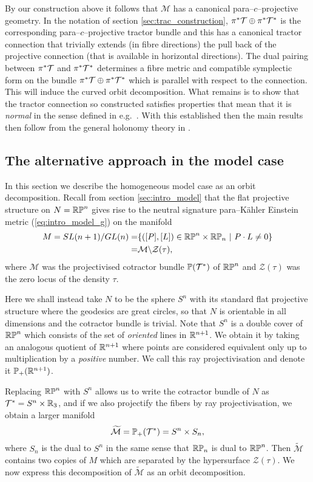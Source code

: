 By our construction above it follows that $\mathcal{M}$ has a canonical para--$c$--projective geometry. In the notation of section \ref{sec:trac_construction}, $\pi^*{\mathcal{T}}\oplus
\pi^*{\mathcal{T}^*}$ is the corresponding para--$c$--projective tractor bundle and this has a canonical tractor connection that trivially
extends (in fibre directions) the pull back of the projective
connection (that is available in horizontal directions). The
dual pairing between $\pi^*{\mathcal{T}}$ and $\pi^*{\mathcal{T}^*}$ determines a
fibre metric and compatible symplectic form on the bundle
$\pi^*{\mathcal{T}}\oplus \pi^*{\mathcal{T}^*}$ which is parallel with respect to the connection. This will induce the curved orbit decomposition. What remains is to show that the tractor connection so
constructed satisfies properties that mean that it is {\em normal} in
the sense defined in e.g.\ \cite{CS-book}. With this established then
the main results then follow from the general holonomy theory in
\cite{CGH-duke}.


\subsection{The alternative approach in the model case}

In this section we describe the homogeneous model case as an orbit decomposition. Recall from section \ref{sec:intro_model} that the flat projective structure on $N=\mathbb{RP}^n$ gives rise to 
the neutral signature para--K\"ahler Einstein metric (\ref{eq:intro_model_g}) on the manifold
\begin{align*}
M=SL(n+1)/GL(n)=&\{([P],[L])\in\mathbb{RP}^n\times\mathbb{RP}_n\ |\ P\cdot L\neq 0\} \\
=& \mathcal{M}\backslash\mathcal{Z}(\tau),
\end{align*}
where $\mathcal{M}$ was the projectivised cotractor bundle $\mathbb{P}(\mathcal{T}^*)$ of $\mathbb{RP}^n$ and $\mathcal{Z}(\tau)$ was the zero locus of the density $\tau$.

Here we shall instead take $N$ to be the sphere $S^n$ with its standard flat projective structure where the geodesics are great circles, so that $N$ is orientable in all dimensions and the cotractor bundle is trivial. Note that $S^n$ is a double cover of $\mathbb{RP}^n$ which consists of the set of \textit{oriented} lines in $\mathbb{R}^{n+1}$. We obtain it by taking an analogous quotient of $\mathbb{R}^{n+1}$ where points are considered equivalent only up to multiplication by a \textit{positive} number. We call this ray projectivisation and denote it $\mathbb{P}_+(\mathbb{R}^{n+1})$.

Replacing $\mathbb{RP}^n$ with $S^n$ allows us to write the cotractor bundle of $N$ as $\mathcal{T}^*=S^n\times\mathbb{R}_3$, and if we also projectify the fibers by ray projectivisation, we obtain a larger manifold
\[
\widetilde{\mathcal{M}}=\mathbb{P}_+(\mathcal{T}^*)=S^n\times S_n,
\]
where $S_n$ is the dual to $S^n$ in the same sense that $\mathbb{RP}_n$ is dual to $\mathbb{RP}^n$. Then $\widetilde{\mathcal{M}}$ contains two copies of $M$ which are separated by the hypersurface $\mathcal{Z}(\tau)$. We now express this decomposition of $\widetilde{\mathcal{M}}$ as an orbit decomposition.


